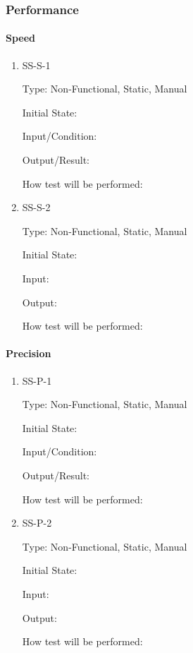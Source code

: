 \documentclass[11pt]{article}
\begin{document}
\subsubsection{Performance}

\paragraph{Speed}

\begin{enumerate}

\item{SS-S-1\\}

Type: Non-Functional, Static, Manual
					
Initial State: 
					
Input/Condition: 
					
Output/Result: 
					
How test will be performed: 
					
\item{SS-S-2\\}

Type: Non-Functional, Static, Manual
					
Initial State: 
					
Input: 
					
Output: 
					
How test will be performed: 

\end{enumerate}

\paragraph{Precision}

\begin{enumerate}

\item{SS-P-1\\}

Type: Non-Functional, Static, Manual
					
Initial State: 
					
Input/Condition: 
					
Output/Result: 
					
How test will be performed: 
					
\item{SS-P-2\\}

Type: Non-Functional, Static, Manual
					
Initial State: 
					
Input: 
					
Output: 
					
How test will be performed: 

\end{enumerate}
\end{document}
